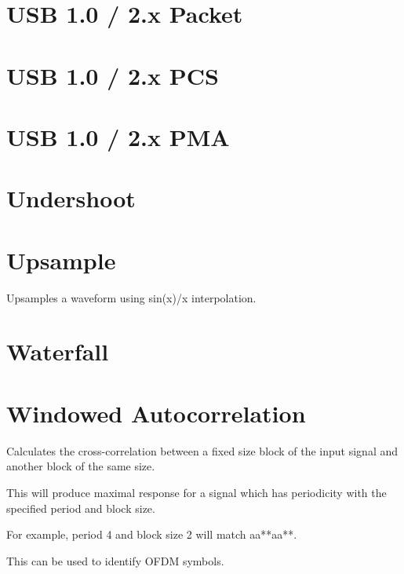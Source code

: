 \section{USB 1.0 / 2.x Packet}

\pagebreak
\section{USB 1.0 / 2.x PCS}

\pagebreak
\section{USB 1.0 / 2.x PMA}

\pagebreak
\section{Undershoot}

\pagebreak
\section{Upsample}

Upsamples a waveform using sin(x)/x interpolation.

\pagebreak
\section{Waterfall}

\pagebreak
\section{Windowed Autocorrelation}

Calculates the cross-correlation between a fixed size block of the input signal and another block of the same size.

This will produce maximal response for a signal which has periodicity with the specified period and block size.

For example, period 4 and block size 2 will match aa**aa**.

This can be used to identify OFDM symbols.
